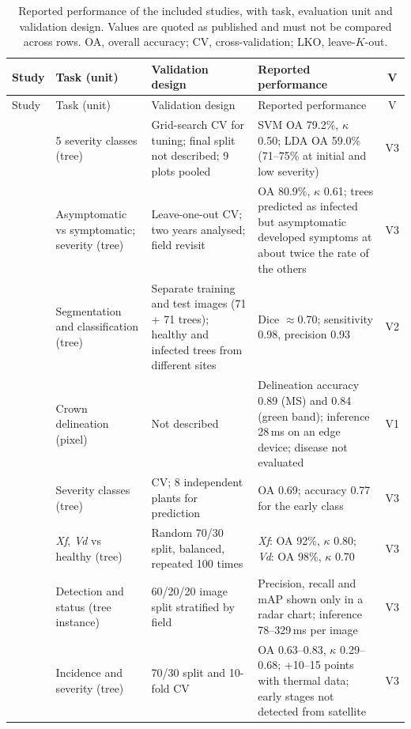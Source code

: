 \documentclass[preprint,12pt]{elsarticle}
\begin{document}
\begin{landscape}
\footnotesize\setlength\tabcolsep{3pt}\renewcommand{\arraystretch}{1.15}
\begin{longtable}{@{}L{2.46cm}L{3.06cm}L{5.27cm}L{6.45cm}c@{}}
\caption{Reported performance of the included studies, with task, evaluation unit and validation design. Values are quoted as published and must not be compared across rows. OA, overall accuracy; CV, cross-validation; LKO, leave-$K$-out.}\label{tab:perfres}\\
\toprule Study & Task (unit) & Validation design & Reported performance & V\\\midrule\endfirsthead
\toprule Study & Task (unit) & Validation design & Reported performance & V\\\midrule\endhead
\bottomrule\endfoot
\citet{u002} & 5 severity classes (tree) & Grid-search CV for tuning; final split not described; 9 plots pooled & SVM OA 79.2\%, $\kappa$ 0.50; LDA OA 59.0\% (71--75\% at initial and low severity) & V3\\
\citet{u008} & Asymptomatic vs symptomatic; severity (tree) & Leave-one-out CV; two years analysed; field revisit & OA 80.9\%, $\kappa$ 0.61; trees predicted as infected but asymptomatic developed symptoms at about twice the rate of the others & V3\\
\citet{u013} & Segmentation and classification (tree) & Separate training and test images (71 + 71 trees); healthy and infected trees from different sites & Dice $\approx$0.70; sensitivity 0.98, precision 0.93 & V2\\
\citet{u021} & Crown delineation (pixel) & Not described & Delineation accuracy 0.89 (MS) and 0.84 (green band); inference 28\,ms on an edge device; disease not evaluated & V1\\
\citet{u036} & Severity classes (tree) & CV; 8 independent plants for prediction & OA 0.69; accuracy 0.77 for the early class & V3\\
\citet{u030} & \textit{Xf}, \textit{Vd} vs healthy (tree) & Random 70/30 split, balanced, repeated 100 times & \textit{Xf}: OA 92\%, $\kappa$ 0.80; \textit{Vd}: OA 98\%, $\kappa$ 0.70 & V3\\
\citet{u055} & Detection and status (tree instance) & 60/20/20 image split stratified by field & Precision, recall and mAP shown only in a radar chart; inference 78--329\,ms per image & V3\\
\citet{u056} & Incidence and severity (tree) & 70/30 split and 10-fold CV & OA 0.63--0.83, $\kappa$ 0.29--0.68; +10--15 points with thermal data; early stages not detected from satellite & V3\\

\end{longtable}
\end{landscape}
\end{document}
